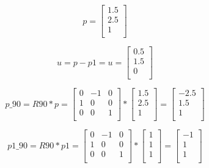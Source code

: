 \documentclass{article}
\begin{document}
\[
    p = \begin{bmatrix}
        1.5 \\
        2.5 \\
        1   \\
    \end{bmatrix}
\]

\[
    u = p - p1 =
    u = \begin{bmatrix}
        0.5 \\
        1.5 \\
        0   \\
    \end{bmatrix}
\]

\[
    p\_90 = R90 * p =
    \begin{bmatrix}
        0 & -1 & 0 \\
        1 & 0  & 0 \\
        0 & 0  & 1 \\
    \end{bmatrix}
    *
    \begin{bmatrix}
        1.5 \\
        2.5 \\
        1   \\
    \end{bmatrix}
    =
    \begin{bmatrix}
        -2.5 \\
        1.5  \\
        1    \\
    \end{bmatrix}
\]


\[
    p1\_90 = R90 * p1 =
    \begin{bmatrix}
        0 & -1 & 0 \\
        1 & 0  & 0 \\
        0 & 0  & 1 \\
    \end{bmatrix}
    *
    \begin{bmatrix}
        1 \\
        1 \\
        1 \\
    \end{bmatrix}
    =
    \begin{bmatrix}
        -1 \\
        1  \\
        1  \\
    \end{bmatrix}
\]
\end{document}
